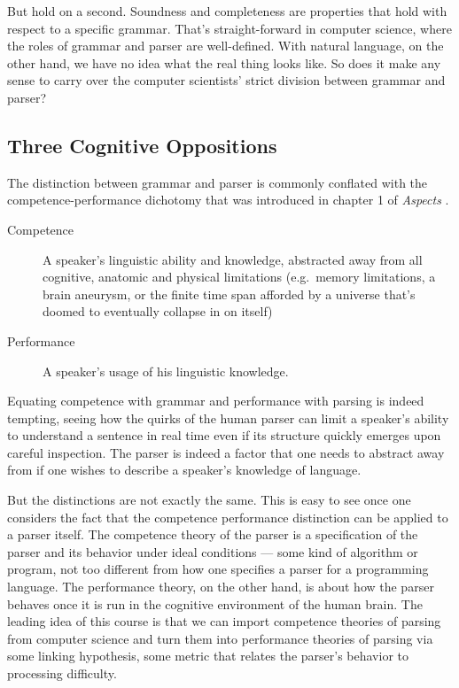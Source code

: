 But hold on a second.
Soundness and completeness are properties that hold with respect to a specific grammar.
That's straight-forward in computer science, where the roles of grammar and parser are well-defined.
With natural language, on the other hand, we have no idea what the real thing looks like.
So does it make any sense to carry over the computer scientists' strict division between grammar and parser?

\subsection{Three Cognitive Oppositions}
\label{sub:BigPicture_Oppositions}
The distinction between grammar and parser is commonly conflated with the competence-performance dichotomy that was introduced in chapter 1 of \emph{Aspects} \citep{Chomsky65}.
%
\begin{description}
    \item[Competence] A speaker's linguistic ability and knowledge, abstracted away from all cognitive, anatomic and physical limitations (e.g.\ memory limitations, a brain aneurysm, or the finite time span afforded by a universe that's doomed to eventually collapse in on itself)
    \item[Performance] A speaker's usage of his linguistic knowledge.
\end{description}
%
Equating competence with grammar and performance with parsing is indeed tempting, seeing how the quirks of the human parser can limit a speaker's ability to understand a sentence in real time even if its structure quickly emerges upon careful inspection.
The parser is indeed a factor that one needs to abstract away from if one wishes to describe a speaker's knowledge of language.

But the distinctions are not exactly the same.
This is easy to see once one considers the fact that the competence performance distinction can be applied to a parser itself.
The competence theory of the parser is a specification of the parser and its behavior under ideal conditions --- some kind of algorithm or program, not too different from how one specifies a parser for a programming language.
The performance theory, on the other hand, is about how the parser behaves once it is run in the cognitive environment of the human brain.
The leading idea of this course is that we can import competence theories of parsing from computer science and turn them into performance theories of parsing via some linking hypothesis, some metric that relates the parser's behavior to processing difficulty.

